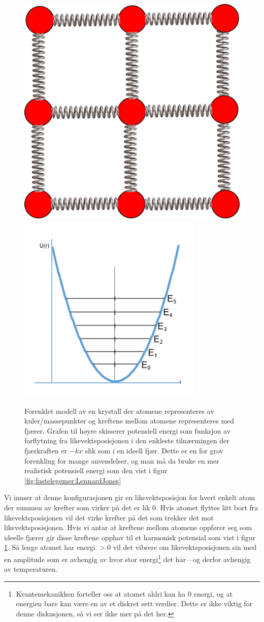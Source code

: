 \begin{figure}[tp]
	\begin{center}
	\includegraphics[width=.3\textwidth]{./krystallmodell}
	\includegraphics[width=.4\textwidth]{./harmonisk}
	\end{center}
	\caption{Forenklet modell av en krystall der atomene representeres av kuler/massepunkter og kreftene mellom atomene representeres med fjærer. Grafen til høyre skisserer potensiell 	energi som funksjon av forflytning fra likevektsposisjonen i den enkleste tilnærmingen der fjærkraften er $-kx$ slik som i en ideell fjær. Dette er en for grov forenkling for mange anvendelser, og man må da bruke en mer realistisk potensiell energi som den vist i figur \ref{fig:fastelegemer:LennardJones}}
	\label{fig:fastelegemer:krystall}
\end{figure}

Vi innser at denne konfigurasjonen gir en likevektsposisjon for hvert enkelt atom der summen av krefter som virker på det er lik 0. Hvis atomet flyttes litt bort fra likevektsposisjonen vil det virke krefter på det som trekker det mot likevektsposisjonen. Hvis vi antar at kreftene mellom atomene oppfører seg som ideelle fjærer gir disse kreftene opphav til et harmonisk potensial som vist i figur \ref{fig:fastelegemer:krystall}. Så lenge atomet har energi $> 0$ vil det vibrere om likevektsposisjonen sin med en amplitude som er avhengig av hvor stor energi\footnote{Kvantemekanikken forteller oss at atomet aldri kan ha 0 energi, og at energien bare kan være en av et diskret sett verdier. Dette er ikke viktig for denne diskusjonen, så vi ser ikke mer på det her.} det har---og derfor avhengig av temperaturen. 

